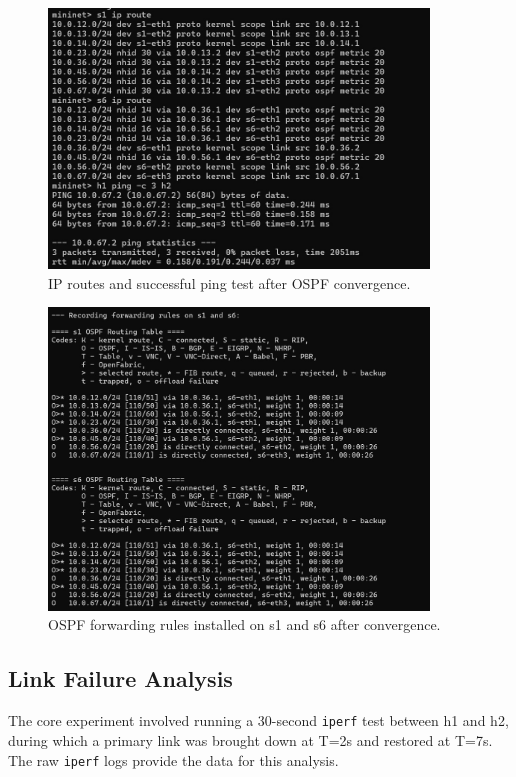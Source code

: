\documentclass[12pt]{article}
\begin{document}
\begin{figure}[h!]
    \centering
    \includegraphics[width=0.9\textwidth]{p4_ip_route_and_ping.jpeg}
    \caption{IP routes and successful ping test after OSPF convergence.}
    \label{fig:ip_route}
\end{figure}

\begin{figure}[h!]
    \centering
    \includegraphics[width=0.9\textwidth]{p4_rules_s1_s6.jpeg}
    \caption{OSPF forwarding rules installed on s1 and s6 after convergence.}
    \label{fig:ospf_rules}
\end{figure}

\subsection{Link Failure Analysis}
The core experiment involved running a 30-second \texttt{iperf} test between h1 and h2, during which a primary link was brought down at T=2s and restored at T=7s. The raw \texttt{iperf} logs provide the data for this analysis.
\end{document}
